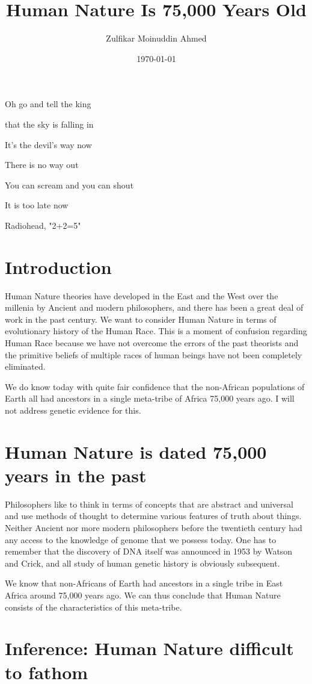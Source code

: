 \documentclass{amsart}
\title{Human Nature Is 75,000 Years Old}
\author{Zulfikar Moinuddin Ahmed}
\date{\today}
\begin{document}
\maketitle
\epigraph{
Oh go and tell the king 

that the sky is falling in

It's the devil's way now

There is no way out

You can scream and you can shout

It is too late now}{Radiohead, "2+2=5"}

\section{Introduction}
Human Nature theories have developed in the East and the West over the millenia by Ancient and modern philosophers, and there has been a great deal of work in the past century.  We want to consider Human Nature in terms of evolutionary history of the Human Race.  This is a moment of confusion regarding Human Race because we have not overcome the errors of the past theorists and the primitive beliefs of multiple races of human beings have not been completely eliminated.  

We do know today with quite fair confidence that the non-African populations of Earth all had ancestors in a single meta-tribe of Africa 75,000 years ago.  I will not address genetic evidence for this.  

\section{Human Nature is dated 75,000 years in the past}
Philosophers like to think in terms of concepts that are abstract and universal and use methods of thought to determine various features of truth about things.  Neither Ancient nor more modern philosophers before the twentieth century had any access to the knowledge of genome that we possess today.  One has to remember that the discovery of DNA itself was announced in 1953 by Watson and Crick, and all study of human genetic history is obviously subsequent.  

We know that non-Africans of Earth had ancestors in a single tribe in East Africa around 75,000 years ago.  We can thus conclude that Human Nature consists of the characteristics of this meta-tribe.  

\section{Inference: Human Nature difficult to fathom}
\end{document}
